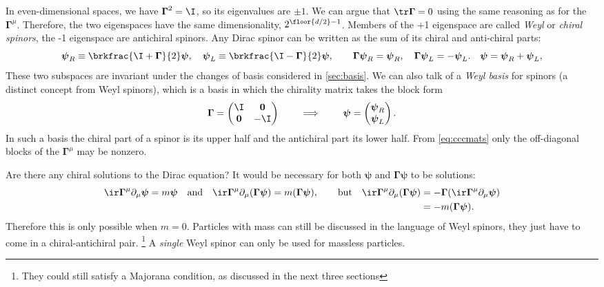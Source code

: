 \documentclass[11pt]{article}
\newcommand{\Gammab}{\boldsymbol{\Gamma}}
\newcommand{\psib}{\boldsymbol{\psi}}
\begin{document}
In even-dimensional spaces, we have $\Gammab^2 = \I$, so its eigenvalues are $\pm 1$.
We can argue that $\tr \Gammab = 0$ using the same reasoning as for the $\Gammab^\mu$.
Therefore, the two eigenspaces have the same dimensionality, $2^{\floor{d/2}-1}$.
Members of the +1 eigenspace are called \emph{Weyl} or \emph{chiral spinors}, the -1 eigenspace are antichiral spinors.
Any Dirac spinor can be written as the sum of its chiral and anti-chiral parts:
%
\begin{equation}\label{eq:Weylanti}
  \psib_R \equiv \brkfrac{\I+\Gammab}{2} \psib,
  \quad
  \psib_L \equiv \brkfrac{\I-\Gammab}{2} \psib,
  \qquad
  \Gammab \psib_R = \psib_R,
  \quad
  \Gammab \psib_L = - \psib_L.
  \quad
  \psib = \psib_R + \psib_L,
\end{equation}
%
These two subspaces are invariant under the changes of basis considered in \cref{sec:basis}.
We can also talk of a \emph{Weyl basis} for spinors (a distinct concept from Weyl spinors), which is a basis in which the chirality matrix takes the block form
%
\begin{equation}\label{eq:weylbasis}
  \Gammab = \begin{pmatrix}
              \I         & \mathbf{0} \\
              \mathbf{0} & -\I        \\
            \end{pmatrix}
  \qquad
  \implies
  \qquad
  \psib = \begin{pmatrix}
            \psib_R \\
            \psib_L \\
          \end{pmatrix}
  .
\end{equation}
%
In such a basis the chiral part of a spinor is its upper half and the antichiral part its lower half.
From \cref{eq:cccmats} only the off-diagonal blocks of the $\Gammab^\mu$ may be nonzero.

Are there any chiral solutions to the Dirac equation?
It would be necessary for both $\psib$ and $\Gammab \psib$ to be solutions:
%
\begin{equation*}
  \ir \Gammab^\mu \partial_\mu \psib = m \psib
  \quad \text{and} \quad
  \ir \Gammab^\mu \partial_\mu (\Gammab \psib) = m (\Gammab \psib),
  \qquad \text{but} \quad
\begin{aligned}[t]
  \ir \Gammab^\mu \partial_\mu (\Gammab \psib)
    &= - \Gammab (\ir \Gammab^\mu \partial_\mu \psib) \\
    &= - m (\Gammab \psib).
\end{aligned}
\end{equation*}
%
Therefore this is only possible when $m=0$.
Particles with mass can still be discussed in the language of Weyl spinors, they just have to come in a chiral-antichiral pair.%
\footnote{They could still satisfy a Majorana condition, as discussed in the next three sections}
A \emph{single} Weyl spinor can only be used for massless particles.
\end{document}
